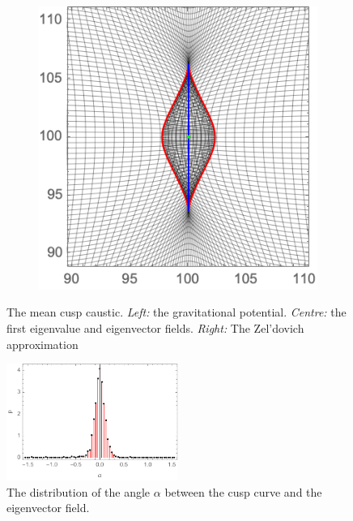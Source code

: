 \documentclass[a4paper, 11pt]{article}
\begin{document}
\begin{figure}
\begin{subfigure}[b]{0.32\textwidth}
\end{subfigure}~
\begin{subfigure}[b]{0.32\textwidth}
\includegraphics[width=\textwidth]{Cusp_mean_Z}
\end{subfigure}
\caption{The mean cusp caustic. \textit{Left:} the gravitational potential. \textit{Centre:} the first eigenvalue and eigenvector fields. \textit{Right:} The Zel'dovich approximation}\label{fig:meanCusp}
\end{figure}

\begin{figure}
\centering
\includegraphics[width=0.5\textwidth]{alpha}
\caption{The distribution of the angle $\alpha$ between the cusp curve and the eigenvector field.} 
\label{fig:alpha}
\end{figure}

\end{document}
